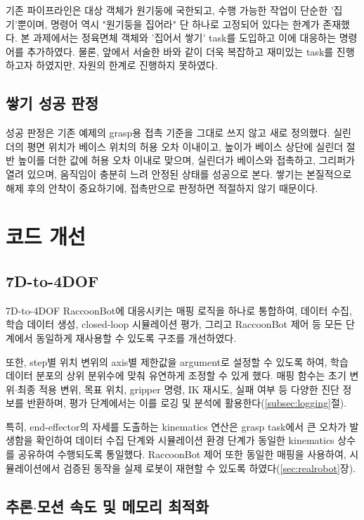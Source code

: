 \documentclass[11pt,a4paper]{article}
\begin{document}
기존 파이프라인은 대상 객체가 원기둥에 국한되고, 수행 가능한 작업이 단순한 '집기'뿐이며,
명령어 역시 "원기둥을 집어라" 단 하나로 고정되어 있다는 한계가 존재했다.
본 과제에서는 정육면체 객체와 '집어서 쌓기' task를 도입하고 이에 대응하는 명령어를 추가하였다.
물론, 앞에서 서술한 바와 같이 더욱 복잡하고 재미있는 task를 진행하고자 하였지만, 자원의 한계로 진행하지 못하였다.

\subsection{쌓기 성공 판정}
\label{subsec:stack-success}

성공 판정은 기존 예제의 grasp용 접촉 기준을 그대로 쓰지 않고 새로 정의했다. 실린더의 평면 위치가 베이스 위치의
허용 오차 이내이고, 높이가 베이스 상단에 실린더 절반 높이를 더한 값에 허용 오차 이내로 맞으며, 실린더가
베이스와 접촉하고, 그리퍼가 열려 있으며, 움직임이 충분히 느려 안정된 상태를 성공으로 본다.
쌓기는 본질적으로 해제 후의 안착이 중요하기에, 접촉만으로 판정하면 적절하지 않기 때문이다.


\section{코드 개선}
\label{sec:code}

\subsection{7D-to-4DOF}
\label{subsec:mapping}

7D-to-4DOF RaccoonBot에 대응시키는 매핑 로직을 하나로 통합하여,
데이터 수집, 학습 데이터 생성, closed-loop 시뮬레이션 평가,
그리고 RaccoonBot 제어 등 모든 단계에서 동일하게 재사용할 수 있도록 구조를 개선하였다.

또한, step별 위치 변위의 axis별 제한값을 argument로 설정할 수 있도록 하여,
학습 데이터 분포의 상위 분위수에 맞춰 유연하게 조정할 수 있게 했다.
매핑 함수는 초기 변위$\cdot$최종 적용 변위, 목표 위치, gripper 명령, IK 재시도, 실패 여부 등 다양한 진단 정보를 반환하며,
평가 단계에서는 이를 로깅 및 분석에 활용한다(\ref{subsec:logging}절).

특히, end-effector의 자세를 도출하는 kinematics 연산은
grasp task에서 큰 오차가 발생함을 확인하여 데이터 수집 단계와
시뮬레이션 환경 단계가 동일한 kinematics 상수를 공유하여 수행되도록 통일했다.
RaccoonBot 제어 또한 동일한 매핑을 사용하여, 시뮬레이션에서 검증된 동작을
실제 로봇이 재현할 수 있도록 하였다(\ref{sec:realrobot}장).

\subsection{추론$\cdot$모션 속도 및 메모리 최적화}
\label{subsec:speed-mem}
\end{document}
